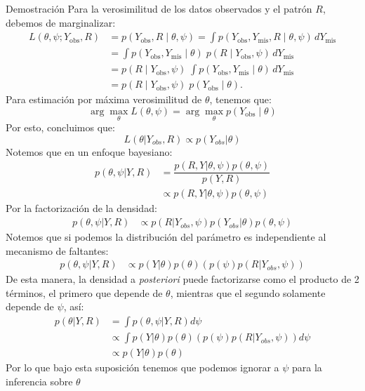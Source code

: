 \documentclass[a4paper,11pt]{article}
\begin{document}
\begin{demostracion}{Demostración}
    Para la verosimilitud de los datos observados y el patrón \(R\), debemos de marginalizar:
    \[
        \begin{aligned}
            L(\theta,\psi;Y_{\text{obs}},R)
             & = p(Y_{\text{obs}},R\mid \theta,\psi)
            = \int p(Y_{\text{obs}},Y_{\text{mis}},R\mid \theta,\psi)\, dY_{\text{mis}}                           \\
             & = \int p(Y_{\text{obs}},Y_{\text{mis}}\mid\theta)\; p(R\mid Y_{\text{obs}},\psi)\, dY_{\text{mis}} \\
             & = p(R\mid Y_{\text{obs}},\psi)\; \int p(Y_{\text{obs}},Y_{\text{mis}}\mid\theta)\, dY_{\text{mis}} \\
             & = p(R\mid Y_{\text{obs}},\psi)\; p(Y_{\text{obs}}\mid\theta).
        \end{aligned}
    \]
    Para estimación por máxima verosimilitud de \(\theta\), tenemos que:
    \[
        \arg\max_\theta L(\theta,\psi)=\arg\max_\theta p(Y_{\text{obs}}\mid\theta)
    \]
    Por esto, concluimos que:
    \[
        L(\theta|Y_{obs},R )\propto p(Y_{obs}|\theta )
    \]
    Notemos que en un enfoque bayesiano:
    \begin{align*}
        p(\theta,\psi|Y,R ) & =\dfrac{p(R,Y|\theta,\psi)p(\theta,\psi)}{p(Y,R)} \\
                            & \propto p(R,Y|\theta,\psi)p(\theta,\psi)
    \end{align*}
    Por la factorización de la densidad:
    \begin{align*}
        p(\theta,\psi|Y,R ) & \propto p(R|Y_{obs},\psi  )p(Y_{obs} |\theta)p(\theta,\psi)
    \end{align*}
    Notemos que si podemos la distribución del parámetro es independiente al mecanismo de faltantes:
    \begin{align*}
        p(\theta,\psi|Y,R ) & \propto p(Y|\theta)p(\theta)\left(p(\psi) p(R|Y_{obs},\psi  )\right)
    \end{align*}
    De esta manera, la densidad a \textit{posteriori} puede factorizarse como el producto de 2 términos, el primero que depende de $\theta$, mientras que el segundo solamente depende de $\psi$, así:
    \begin{align*}
        p(\theta| Y,R) & =\int p(\theta,\psi|Y,R)d\psi                                                 \\
                       & \propto\int p(Y|\theta)p(\theta)\left(p(\psi) p(R|Y_{obs},\psi  )\right)d\psi \\
                       & \propto  p(Y|\theta)p(\theta)
    \end{align*}
    Por lo que bajo esta suposición tenemos que podemos ignorar a  $\psi$ para la inferencia sobre $\theta$
\end{demostracion}
\end{document}
